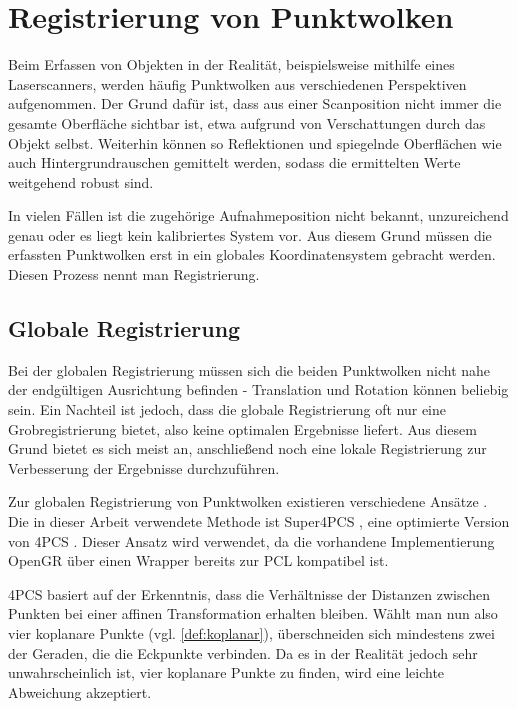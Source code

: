 \section{Registrierung von Punktwolken}
\label{sec:registration}

Beim Erfassen von Objekten in der Realität, beispielsweise mithilfe eines Laserscanners, werden häufig Punktwolken aus verschiedenen Perspektiven aufgenommen.
Der Grund dafür ist, dass aus einer Scanposition nicht immer die gesamte Oberfläche sichtbar ist, etwa aufgrund von Verschattungen durch das Objekt selbst.
Weiterhin können so Reflektionen und spiegelnde Oberflächen wie auch Hintergrundrauschen gemittelt werden, sodass die ermittelten Werte weitgehend robust sind.

In vielen Fällen ist die zugehörige Aufnahmeposition nicht bekannt, unzureichend genau oder es liegt kein kalibriertes System vor.
Aus diesem Grund müssen die erfassten Punktwolken erst in ein globales Koordinatensystem gebracht werden.
Diesen Prozess nennt man Registrierung.


\subsection{Globale Registrierung}
\label{subsec:global-registration}

Bei der globalen Registrierung müssen sich die beiden Punktwolken nicht nahe der endgültigen Ausrichtung befinden - Translation und Rotation können beliebig sein.
Ein Nachteil ist jedoch, dass die globale Registrierung oft nur eine Grobregistrierung bietet, also keine optimalen Ergebnisse liefert.
Aus diesem Grund bietet es sich meist an, anschließend noch eine lokale Registrierung zur Verbesserung der Ergebnisse durchzuführen.

Zur globalen Registrierung von Punktwolken existieren verschiedene Ansätze \cite{chaudhury2015global, zhou2016fast, rusu2009fast}.
Die in dieser Arbeit verwendete Methode ist Super4PCS \cite{mellado2014super4pcs}, eine optimierte Version von \ac{4PCS} \cite{aiger2008fpcs}.
Dieser Ansatz wird verwendet, da die vorhandene Implementierung \ac{OpenGR} \cite{mellado2018opengr} über einen Wrapper bereits zur \ac{PCL} kompatibel ist.

\ac{4PCS} basiert auf der Erkenntnis, dass die Verhältnisse der Distanzen zwischen Punkten bei einer affinen Transformation erhalten bleiben.
Wählt man nun also vier koplanare Punkte (vgl. \autoref{def:koplanar}), überschneiden sich mindestens zwei der Geraden, die die Eckpunkte verbinden.
Da es in der Realität jedoch sehr unwahrscheinlich ist, vier koplanare Punkte zu finden, wird eine leichte Abweichung akzeptiert.

